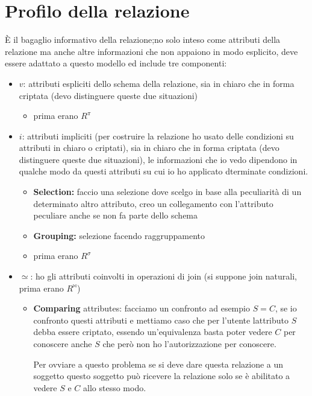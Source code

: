 \documentclass{report}
\begin{document}
\section{Profilo della relazione}
È il bagaglio informativo della relazione;no solo inteso come attributi della relazione ma anche altre informazioni che non appaiono in modo esplicito, deve essere adattato a questo modello ed include tre componenti:
\begin{itemize}
    \item $v$: attributi espliciti dello schema della relazione, sia in chiaro che in forma criptata (devo distinguere queste due situazioni)
    \begin{itemize}
        \item prima erano $R^\pi$
    \end{itemize}
    \item $i$: attributi impliciti (per costruire la relazione ho usato delle condizioni su attributi in chiaro o criptati), sia in chiaro che in forma criptata (devo distinguere queste due situazioni), le informazioni che io vedo dipendono in qualche modo da questi attributi su cui io ho applicato dterminate condizioni.
    
    \begin{itemize}
        \item \textbf{Selection:} faccio una selezione dove scelgo in base alla peculiarità di un determinato altro attributo, creo un collegamento con l'attributo peculiare anche se non fa parte dello schema
        \item \textbf{Grouping:} selezione facendo raggruppamento 
    \end{itemize}
    \begin{itemize}
        \item prima erano $R^\sigma$
    \end{itemize}
    \item $\simeq$: ho gli attributi coinvolti in operazioni di join (si suppone join naturali, prima erano $R^{\bowtie}$)
    \begin{itemize}
        \item \textbf{Comparing} attributes: facciamo un confronto ad esempio $S=C$, se io confronto questi attributi e mettiamo caso che per l'utente lattributo $S$ debba essere criptato, essendo un'equivalenza basta poter vedere $C$ per conoscere anche $S$ che però non ho l'autorizzazione per conoscere.
        
        \noindent Per ovviare a questo problema se si deve dare questa relazione a un soggetto questo soggetto può ricevere la relazione solo se è abilitato a vedere $S$ e $C$ allo stesso modo.
    \end{itemize}
\end{itemize}
\end{document}
